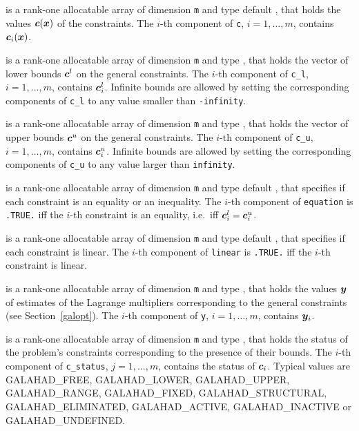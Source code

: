 \documentclass{galahad}
\newcommand{\sym}{\sf\small}
\begin{document}
\begin{description}
 is a rank-one allocatable array of dimension {\tt m} and type default 
\realdp, that holds
the values ${\bm{c}}({\bm{x}} )$ of the constraints.
The $i$-th component of {\tt c}, $i = 1,  \ldots ,  m$, contains 
${\bm{c}}_{i}({\bm{x}})$.  

 is a rank-one allocatable array of dimension {\tt m} and type 
\realdp, that holds the vector of lower bounds ${\bm{c}}^{l}$ 
on the general constraints. The $i$-th component of 
{\tt c\_l}, $i = 1, \ldots , m$, contains ${\bm{c}}_{i}^{l}$.
Infinite bounds are allowed by setting the corresponding 
components of {\tt c\_l} to any value smaller than {\tt -infinity}. 

 is a rank-one allocatable array of dimension {\tt m} and type 
\realdp, that holds the vector of upper bounds ${\bm{c}}^{u}$ 
on the general constraints. The $i$-th component of 
{\tt c\_u}, $i = 1,  \ldots ,  m$, contains ${\bm{c}}_{i}^{u}$.
Infinite bounds are allowed by setting the corresponding 
components of {\tt c\_u} to any value larger than {\tt infinity}.

 is a rank-one allocatable array of dimension {\tt m} and
type default \logical, that specifies if each constraint is an equality
or an inequality. The $i$-th component of {\tt equation} is {\tt .TRUE.}
iff the $i$-th constraint is an equality, i.e.\ iff ${\bm{c}}^l_i = {\bm{c}}^u_i$.

 is a rank-one allocatable array of dimension {\tt m} and
type default \logical, that specifies if each constraint is linear.
The $i$-th component of {\tt linear} is {\tt .TRUE.}
iff the $i$-th constraint is linear.

 is a rank-one allocatable array of dimension {\tt m} and type 
\realdp, that holds
the values ${\bm{y}}$ of estimates  of the Lagrange multipliers
corresponding to the general constraints (see Section~\ref{galopt}).
The $i$-th component of {\tt y}, $i = 1,  \ldots ,  m$, contains ${\bm{y}}_{i}$.  

 is  a rank-one allocatable array of dimension {\tt m} and type 
\integer, that holds the status of the problem's constraints
corresponding to the presence of their bounds. The $i$-th component of 
{\tt c\_status}, $j = 1,  \ldots ,  m$, contains the status of ${\bm{c}}_i$.
Typical values are
{\sym GALAHAD\_FREE},  {\sym GALAHAD\_LOWER}, {\sym GALAHAD\_UPPER},
{\sym GALAHAD\_RANGE}, {\sym GALAHAD\_FIXED}, {\sym GALAHAD\_STRUCTURAL},
{\sym GALAHAD\_ELIMINATED}, {\sym GALAHAD\_ACTIVE}, 
{\sym GALAHAD\_INACTIVE} or {\sym GALAHAD\_UNDEFINED}.
        

\end{description}
\end{document}
